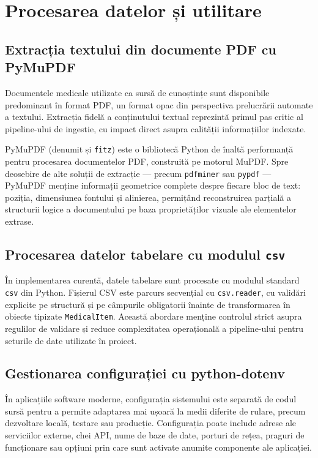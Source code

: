 \documentclass[12pt, a4paper, oneside, romanian]{teza-upb}
\begin{document}
\section{Procesarea datelor și utilitare}

\subsection{Extracția textului din documente PDF cu PyMuPDF}

Documentele medicale utilizate ca sursă de cunoștințe sunt disponibile predominant în format PDF, un format opac din perspectiva prelucrării automate a textului. Extracția fidelă a conținutului textual reprezintă primul pas critic al pipeline-ului de ingestie, cu impact direct asupra calității informațiilor indexate.

PyMuPDF (denumit și \texttt{fitz}) este o bibliotecă Python de înaltă performanță pentru procesarea documentelor PDF, construită pe motorul MuPDF. Spre deosebire de alte soluții de extracție — precum \texttt{pdfminer} sau \texttt{pypdf} — PyMuPDF menține informații geometrice complete despre fiecare bloc de text: poziția, dimensiunea fontului și alinierea, permițând reconstruirea parțială a structurii logice a documentului pe baza proprietăților vizuale ale elementelor extrase.\cite{pymupdf_doc}

\subsection{Procesarea datelor tabelare cu modulul \texttt{csv}}

În implementarea curentă, datele tabelare sunt procesate cu modulul standard
\texttt{csv} din Python. Fișierul CSV este parcurs secvențial cu \texttt{csv.reader}, cu
validări explicite pe structură și pe câmpurile obligatorii înainte de
transformarea în obiecte tipizate \texttt{MedicalItem}. Această abordare menține
controlul strict asupra regulilor de validare și reduce complexitatea
operațională a pipeline-ului pentru seturile de date utilizate în proiect.


\subsection{Gestionarea configurației cu python-dotenv}

În aplicațiile software moderne, configurația sistemului este separată de codul sursă pentru a permite adaptarea mai ușoară la medii diferite de rulare, precum dezvoltare locală, testare sau producție. Configurația poate include adrese ale serviciilor externe, chei API, nume de baze de date, porturi de rețea, praguri de funcționare sau opțiuni prin care sunt activate anumite componente ale aplicației.
\end{document}
